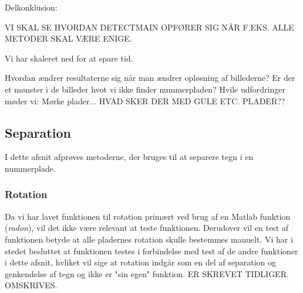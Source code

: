 \begin{comment} %
\subsubsection*{Observeret sæt på 407 billeder}
Scale: 0.25
DetectMain: 96.6/99.24
DetectQuant: 67.8/75.4
DetectSameness: 56.8/95.5
DetectContrastAvg: 62.7/85.0
DetectPlateness: 50.4/65.5
DetectCStretch: 84.0/92.7

Scale: 0.50 (Ekstremt langsomt)
DetectPlateness: 29.7/56.5
DetectCStretch:
\end{comment}


Delkonklusion:

VI SKAL SE HVORDAN DETECTMAIN OPFØRER SIG NÅR F.EKS. ALLE METODER SKAL VÆRE ENIGE.

Vi har skaleret ned for at spare tid.

Hvordan ændrer resultaterne sig når man ændrer opløsning af billederne?
Er der et mønster i de billeder hvot vi ikke finder nummerpladen? Hvile udfordringer møder vi: Mørke plader... 
HVAD SKER DER MED GULE ETC. PLADER??



\subsection{Separation}


I dette afsnit afprøves metoderne, der bruges til at separere tegn i en nummerplade.

\subsubsection*{Rotation}

Da vi har lavet funktionen til rotation primært ved brug af en Matlab funktion (\textit{radon}), vil det ikke være relevant at teste funktionen. Derudover vil en test af funktionen betyde at alle pladernes rotation skulle bestemmes manuelt. Vi har i stedet besluttet at funktionen testes i forbindelse med test af de andre funktioner i dette afsnit, hvliket vil sige at rotation indgår som en del af separation og genkendelse af tegn og ikke er "sin egen" funktion. ER SKREVET TIDLIGER. OMSKRIVES.

